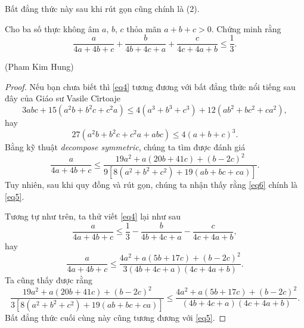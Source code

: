\documentclass[12pt,a4paper]{book}
\begin{document}
Bất đẳng thức này sau khi rút gọn cũng chính là (2). 

\begin{baitoan}
Cho ba số thực không âm $a,\,b,\,c$ thỏa mãn $a+b+c>0.$ Chứng minh rằng
\begin{equation}\label{eq4}
\frac{a}{4 a+4b+c}+\frac{b}{4b+4 c+a}+\frac{c}{4c+4a+b} \leqslant \frac{1}{3}.
\end{equation}
\begin{flushright}(Pham Kim Hung)\end{flushright}
\end{baitoan}

\begin{proof}
Nếu bạn chưa biết thì \eqref{eq4} tương đương với bất đẳng thức nổi tiếng sau đây của Giáo sư Vasile Cîrtoaje
\[3abc+15(a^2b+b^2c+c^2a) \le 4(a^3+b^3+c^3)+12(ab^2+bc^2+ca^2),\]
hay
\begin{equation}\label{eq5}
27(a^2b+b^2c+c^2a+abc) \leqslant 4(a+b+c)^3.
\end{equation}
Bằng kỹ thuật \textit{decompose symmetric}, chúng ta tìm được đánh giá
\begin{equation}\label{eq6}
\frac{a}{4a+4b+c} \leqslant \frac{19a^2 + a(20b+41c)+(b-2c)^2}{9[8(a^2+b^2+c^2)+19(ab+bc+ca)]}.
\end{equation}
Tuy nhiên, sau khi quy đồng và rút gọn, chúng ta nhận thấy rằng \eqref{eq6} chính là \eqref{eq5}. 

Tương tự như trên, ta thử viết \eqref{eq4} lại như sau
$$\displaystyle \frac{a}{4 a+4b+c} \leqslant \frac{1}{3} - \frac{b}{4b+4 c+a}-\frac{c}{4c+4a+b},$$
hay
$$\displaystyle \frac{a}{4 a+4b+c} \leqslant \frac{4a^2+a(5b+17c)+(b-2c)^2}{3(4b+4 c+a)(4c+4a+b)}.$$
Ta cũng thấy được rằng
$$\displaystyle \frac{19a^2 + a(20b+41c)+(b-2c)^2}{3[8(a^2+b^2+c^2)+19(ab+bc+ca)]} \leqslant \frac{4a^2+a(5b+17c)+(b-2c)^2}{(4b+4 c+a)(4c+4a+b)}.$$
Bất đẳng thức cuối cùng này cũng tương đương với \eqref{eq5}.
\end{proof}
\end{document}
